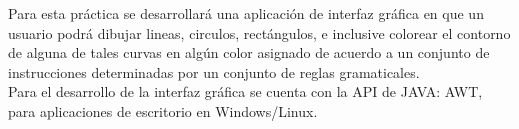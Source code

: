Para esta práctica se desarrollará una aplicación de interfaz gráfica en que un usuario
podrá dibujar lineas, circulos, rectángulos, e inclusive colorear el contorno de alguna 
de tales curvas en algún color asignado de acuerdo a un conjunto de instrucciones 
determinadas por un conjunto de reglas gramaticales. \\
Para el desarrollo de la interfaz gráfica se cuenta con la API de JAVA: AWT, para 
aplicaciones de escritorio en Windows/Linux. \\
